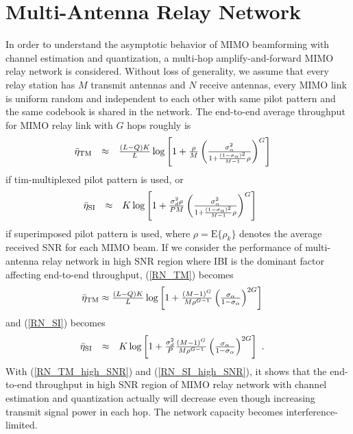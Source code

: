 \documentclass[10pt,fleqn, twocolumn]{IEEEtran}
\begin{document}
\section{Multi-Antenna Relay Network}
In order to understand the asymptotic behavior of MIMO beamforming
with channel estimation and quantization, a multi-hop
amplify-and-forward MIMO relay network is considered. Without loss
of generality, we assume that every relay station has $M$ transmit
antennas and $N$ receive antennas, every MIMO link is uniform
random and independent to each other with same pilot pattern and
the same codebook is shared in the network. The end-to-end average
throughput for MIMO relay link with $G$ hops roughly is
\begin{equation}\hspace{-0.15in}
\begin{array}{rcl}
\bar\eta_{\rm
TM}&\approx&\frac{(L-Q)K}{L}\log\left[1+\frac{\rho}{M}\left(\frac{\sigma_{\alpha}^{2}}{1+\frac{(1-\sigma_{\alpha})^2}{M-1}\rho}\right)^{G}\right]
\end{array}\label{RN_TM}
\end{equation}
\noindent if tim-multiplexed pilot pattern is used, or
\begin{equation}\hspace{-0.23in}
\begin{array}{rcl}
\bar\eta_{\rm
SI}&\approx&K\log\left[1+\frac{\sigma_{d}^{2}\rho}{PM}\left(\frac{\sigma_{\alpha}^{2}}{1+\frac{(1-\sigma_{\alpha})^2}{M-1}\rho}\right)^{G}\right]
\end{array}\label{RN_SI}
\end{equation}
\noindent if superimposed pilot pattern is used, where
$\rho=\mbox{E}\{\rho_{k}\}$ denotes the average received SNR for
each MIMO beam. If we consider the performance of multi-antenna
relay network in high SNR region where IBI is the dominant factor
affecting end-to-end throughput, (\ref{RN_TM}) becomes
\begin{equation}\hspace{-0.18in}
\begin{array}{l}
\bar\eta_{\rm
TM}\approx\frac{(L-Q)K}{L}\log\left[1+\frac{(M-1)^{G}}{M\rho^{G-1}}\left(\frac{\sigma_{\alpha}}{1-\sigma_{\alpha}}\right)^{2G}\right]
\end{array}\label{RN_TM_high_SNR}
\end{equation}
\noindent and (\ref{RN_SI}) becomes
\begin{equation}\hspace{-0.23in}
\begin{array}{rcl}
\bar\eta_{\rm
SI}&\approx&K\log\left[1+\frac{\sigma_{d}^{2}}{P}\frac{(M-1)^{G}}{M\rho^{G-1}}\left(\frac{\sigma_{\alpha}}{1-\sigma_{\alpha}}\right)^{2G}\right]
\end{array}.\label{RN_SI_high_SNR}
\end{equation}
With (\ref{RN_TM_high_SNR}) and (\ref{RN_SI_high_SNR}), it shows
that the end-to-end throughput in high SNR region of MIMO relay
network with channel estimation and quantization actually will
decrease even though increasing transmit signal power in each hop.
The network capacity becomes interference-limited.
\end{document}
